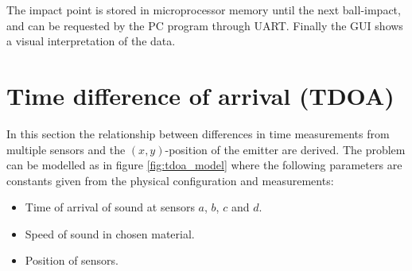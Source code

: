 	The impact point is stored in microprocessor memory until the next ball-impact, and can be requested by the PC program through UART.
	Finally the GUI shows a visual interpretation of the data.
	\section{Time difference of arrival (TDOA)}
	In this section the relationship between differences in time measurements from multiple sensors and the $(x,y)$-position of the emitter are derived.
	The problem can be modelled as in figure \ref{fig:tdoa_model} where the following parameters are constants given from the physical configuration and measurements:
	\begin{itemize}
		\item Time of arrival of sound at sensors $a$, $b$, $c$ and $d$.
		\item Speed of sound in chosen material.
		\item Position of sensors.
	\end{itemize}

